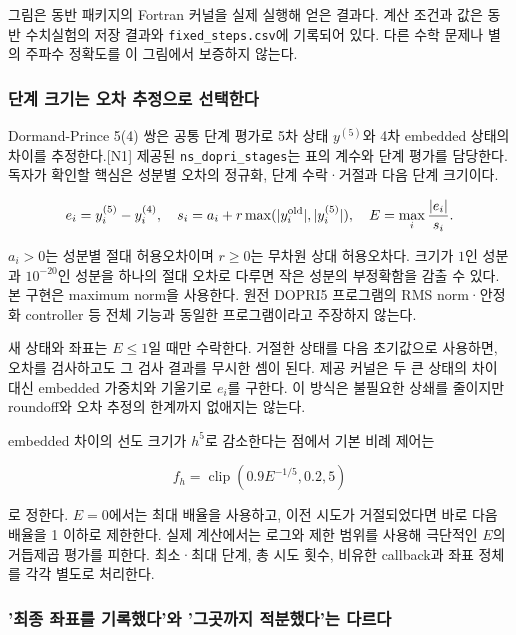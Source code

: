 \documentclass[
  10pt,
  a4paper,
]{article}
\begin{document}
그림은 동반 패키지의 Fortran 커널을 실제 실행해 얻은 결과다. 계산 조건과
값은 동반 수치실험의 저장 결과와 \texttt{fixed\_steps.csv}에 기록되어
있다. 다른 수학 문제나 별의 주파수 정확도를 이 그림에서 보증하지 않는다.

\subsubsection{단계 크기는 오차 추정으로
선택한다}\label{uxb2e8uxacc4-uxd06cuxae30uxb294-uxc624uxcc28-uxcd94uxc815uxc73cuxb85c-uxc120uxd0dduxd55cuxb2e4}

Dormand-Prince 5(4) 쌍은 공통 단계 평가로 5차 상태 \(y^{(5)}\)와 4차
embedded 상태의 차이를 추정한다.{[}N1{]} 제공된
\texttt{ns\_dopri\_stages}는 표의 계수와 단계 평가를 담당한다. 독자가
확인할 핵심은 성분별 오차의 정규화, 단계 수락·거절과 다음 단계 크기이다.

\[
e_i=y_i^{(5)}-y_i^{(4)},\quad
s_i=a_i+r\max(|y_i^{\rm old}|,|y_i^{(5)}|),\quad
E=\max_i\frac{|e_i|}{s_i}.
\]

\(a_i>0\)는 성분별 절대 허용오차이며 \(r\ge0\)는 무차원 상대 허용오차다.
크기가 \(1\)인 성분과 \(10^{-20}\)인 성분을 하나의 절대 오차로 다루면
작은 성분의 부정확함을 감출 수 있다. 본 구현은 maximum norm을 사용한다.
원전 DOPRI5 프로그램의 RMS norm·안정화 controller 등 전체 기능과 동일한
프로그램이라고 주장하지 않는다.

새 상태와 좌표는 \(E\le1\)일 때만 수락한다. 거절한 상태를 다음
초기값으로 사용하면, 오차를 검사하고도 그 검사 결과를 무시한 셈이 된다.
제공 커널은 두 큰 상태의 차이 대신 embedded 가중치와 기울기로 \(e_i\)를
구한다. 이 방식은 불필요한 상쇄를 줄이지만 roundoff와 오차 추정의
한계까지 없애지는 않는다.

embedded 차이의 선도 크기가 \(h^5\)로 감소한다는 점에서 기본 비례 제어는

\[f_h=\operatorname{clip}(0.9E^{-1/5},0.2,5)\]

로 정한다. \(E=0\)에서는 최대 배율을 사용하고, 이전 시도가 거절되었다면
바로 다음 배율을 1 이하로 제한한다. 실제 계산에서는 로그와 제한 범위를
사용해 극단적인 \(E\)의 거듭제곱 평가를 피한다. 최소·최대 단계, 총 시도
횟수, 비유한 callback과 좌표 정체를 각각 별도로 처리한다.

\subsubsection{'최종 좌표를 기록했다'와 '그곳까지 적분했다'는
다르다}\label{uxcd5cuxc885-uxc88cuxd45cuxb97c-uxae30uxb85duxd588uxb2e4uxc640-uxadf8uxacf3uxae4cuxc9c0-uxc801uxbd84uxd588uxb2e4uxb294-uxb2e4uxb974uxb2e4}
\end{document}
